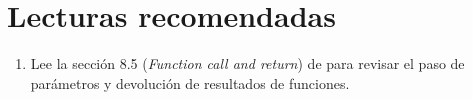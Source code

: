 \section{Lecturas recomendadas}

\begin{enumerate}

\item Lee la sección 8.5 (\emph{Function call and return}) 
      de \pppbook{}
      para revisar el paso de parámetros y devolución de resultados de funciones.

\end{enumerate}
